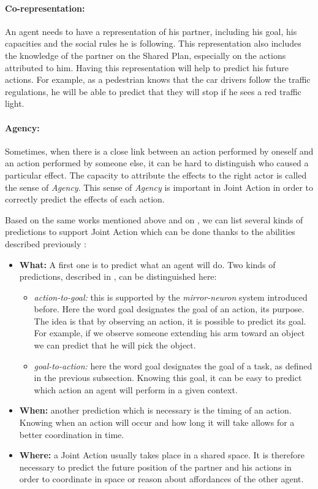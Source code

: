 \documentclass[english,a4paper,11pt,twoside]{StyleThese}
\begin{document}
\paragraph{Co-representation:} An agent needs to have a representation of his partner, including his goal, his capacities and the social rules he is following. This representation also includes the knowledge of the partner on the Shared Plan, especially on the actions attributed to him. Having this representation will help to predict his future actions. For example, as a pedestrian knows that the car drivers follow the traffic regulations, he will be able to predict that they will stop if he sees a red traffic light.

\paragraph{Agency:} Sometimes, when there is a close link between an action performed by oneself and an action performed by someone else, it can be hard to distinguish who caused a particular effect. The capacity to attribute the effects to the right actor is called the sense of \textit{Agency}. This sense of \textit{Agency} is important in Joint Action in order to correctly predict the effects of each action.

\bigskip
Based on the same works mentioned above and on \cite{sebanz2009prediction}, we can list several kinds of predictions to support Joint Action which can be done thanks to the abilities described previously :

\begin{itemize}
\item \textbf{What:} A first one is to predict what an agent will do. Two kinds of predictions, described in \cite{pacherie2011phenomenology}, can be distinguished here:
\begin{itemize}
\item \textit{action-to-goal:} this is supported by the \textit{mirror-neuron} system introduced before. Here the word goal designates the goal of an action, its purpose. The idea is that by observing an action, it is possible to predict its goal. For example, if we observe someone extending his arm toward an object we can predict that he will pick the object.
\item \textit{goal-to-action:} here the word goal designates the goal of a task, as defined in the previous subsection. Knowing this goal, it can be easy to predict which action an agent will perform in a given context.
\end{itemize}
\item \textbf{When:} another prediction which is necessary is the timing of an action. Knowing when an action will occur and how long it will take allows for a better coordination in time.
\item \textbf{Where:} a Joint Action usually takes place in a shared space. It is therefore necessary to predict the future position of the partner and his actions in order to coordinate in space or reason about affordances of the other agent.
\end{itemize} 
\end{document}
